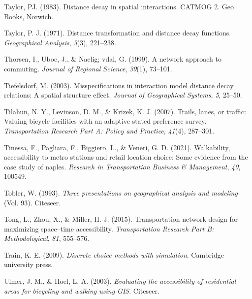 \documentclass[12pt,twoside]{reedthesis}
\newlength{\cslhangindent}
\newenvironment{CSLReferences}[2] %
 {%
  \setlength{\parindent}{0pt}
  \ifodd #1 \everypar{\setlength{\hangindent}{\cslhangindent}}\ignorespaces\fi
  \ifnum #2 > 0
  \setlength{\parskip}{#2\baselineskip}
  \fi
 }%
 {}
\begin{document}
\begin{CSLReferences}{1}{0}
\leavevmode{}%
Taylor, PJ. (1983). Distance decay in spatial interactions. CATMOG 2. Geo Books, Norwich.

\leavevmode{}%
Taylor, P. J. (1971). Distance transformation and distance decay functions. \emph{Geographical Analysis}, \emph{3}(3), 221--238.

\leavevmode{}%
Thorsen, I., Uboe, J., \& Naelig; vdal, G. (1999). A network approach to commuting. \emph{Journal of Regional Science}, \emph{39}(1), 73--101.

\leavevmode{}%
Tiefelsdorf, M. (2003). Misspecifications in interaction model distance decay relations: A spatial structure effect. \emph{Journal of Geographical Systems}, \emph{5}, 25--50.

\leavevmode{}%
Tilahun, N. Y., Levinson, D. M., \& Krizek, K. J. (2007). Trails, lanes, or traffic: Valuing bicycle facilities with an adaptive stated preference survey. \emph{Transportation Research Part A: Policy and Practice}, \emph{41}(4), 287--301.

\leavevmode{}%
Tinessa, F., Pagliara, F., Biggiero, L., \& Veneri, G. D. (2021). Walkability, accessibility to metro stations and retail location choice: Some evidence from the case study of naples. \emph{Research in Transportation Business \& Management}, \emph{40}, 100549.

\leavevmode{}%
Tobler, W. (1993). \emph{Three presentations on geographical analysis and modeling} (Vol. 93). Citeseer.

\leavevmode{}%
Tong, L., Zhou, X., \& Miller, H. J. (2015). Transportation network design for maximizing space--time accessibility. \emph{Transportation Research Part B: Methodological}, \emph{81}, 555--576.

\leavevmode{}%
Train, K. E. (2009). \emph{Discrete choice methods with simulation}. Cambridge university press.

\leavevmode{}%
Ulmer, J. M., \& Hoel, L. A. (2003). \emph{Evaluating the accessibility of residential areas for bicycling and walking using GIS}. Citeseer.


\end{CSLReferences}
\end{document}
